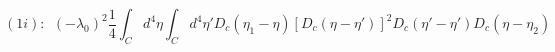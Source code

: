 \begin{equation}
(1i):~~
(-\lambda_0)^2\frac{1}{4}\int_Cd^4\eta \int_Cd^4\eta' D_c(\eta_1 - \eta)[D_c(\eta - \eta')]^2D_c(\eta' - \eta')D_c(\eta - \eta_2)
\end{equation}

